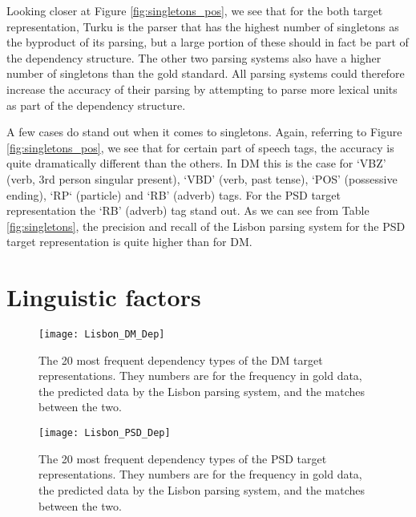 Looking closer at Figure \ref{fig:singletons_pos}, we see that for the both target representation, Turku is the parser that has the highest number of singletons as the byproduct of its parsing, but a large portion of these should in fact be part of the dependency structure. The other two parsing systems also have a higher number of singletons than the gold standard. All parsing systems could therefore increase the accuracy of their parsing by attempting to parse more lexical units as part of the dependency structure.

A few cases do stand out when it comes to singletons. Again, referring to Figure \ref{fig:singletons_pos}, we see that for certain part of speech tags, the accuracy is quite dramatically different than the others. In DM this is the case for `VBZ' (verb, 3rd person singular present), `VBD' (verb, past tense), `POS' (possessive ending), `RP` (particle) and `RB' (adverb) tags. For the PSD target representation the `RB' (adverb) tag stand out. As we can see from Table \ref{fig:singletons}, the precision and recall of the Lisbon parsing system for the PSD target representation is quite higher than for DM.


\section{Linguistic factors}

\begin{figure}[h]
    \centering
    \begin{minipage}{0.8\textwidth}
        \centering
        \texttt{[image: Lisbon\_DM\_Dep]}
    \end{minipage}\hfill
    \caption{The 20 most frequent dependency types of the DM target representations. They numbers are for the frequency in gold data, the predicted data by the Lisbon parsing system, and the matches between the two.}
    \label{fig:lisbon_dep_1}
\end{figure}

\begin{figure}[h]
    \centering
    \begin{minipage}{0.8\textwidth}
        \centering
        \texttt{[image: Lisbon\_PSD\_Dep]}
    \end{minipage}
    \caption{The 20 most frequent dependency types of the PSD target representations. They numbers are for the frequency in gold data, the predicted data by the Lisbon parsing system, and the matches between the two.}
    \label{fig:lisbon_dep_2}
\end{figure}

